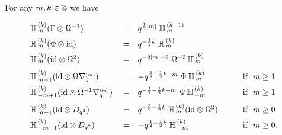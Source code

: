 \begin{lemma} \label{lemma:YaH:properties}
For any $m,k\in\mathbb{Z}$ we have
$$\begin{array}{lclcl}
\YaH{m}{k} (\Gamma \tens \Omega^{-1})
          &\vertXL =&   q^{\frac{1}{2}|m|}\; \YaH{m}{k-1}  \\
\YaH{m}{k} (\Phi \tens \id)
          &\vertXL =&   q^{-\frac{1}{2}k}\; \YaH{m}{k}     \\
\YaH{m}{k} (\id \tens \Omega^2)
          &\vertXL =&   q^{-2|m|-2}\; \Omega^{-2} \, \YaH{m}{k}     \\
\YaH{m-1}{k} (\id \tens \Omega \nabq{m})
          &\vertXXL =&  -q^{\frac{3}{2} -\frac{1}{2}k -m} \; \Psi \,\YaH{m}{k}
          &  \hspace{1em} &  {\rm if}\;\; m\geq 1     \\
\YaH{-m+1}{k} (\id \tens \Omega^{-1} \nabq{m})
          &\vertXL =&   q^{-\frac{1}{2} -\frac{1}{2}k + m} \; \Psi \, \YaH{-m}{k}
          &  \hspace{1em} &  {\rm if}\;\; m\geq 1     \\
\YaH{m+1}{k} (\id \tens D_{q^2})
          &\vertXXL =&  q^{-\frac{3}{2} -\frac{1}{2}k} \;
          \YaH{m}{k} (\id \tens \Omega^2)
          &  \hspace{1em} &  {\rm if}\;\; m\geq 0     \\
\YaH{-m-1}{k} (\id \tens D_{q^2})
          &\vertXL =&  -q^{\frac{1}{2} -\frac{1}{2}k} \; \YaH{-m}{k}
          &  \hspace{1em} &  {\rm if}\;\; m\geq 0.
\end{array}$$
\end{lemma}
